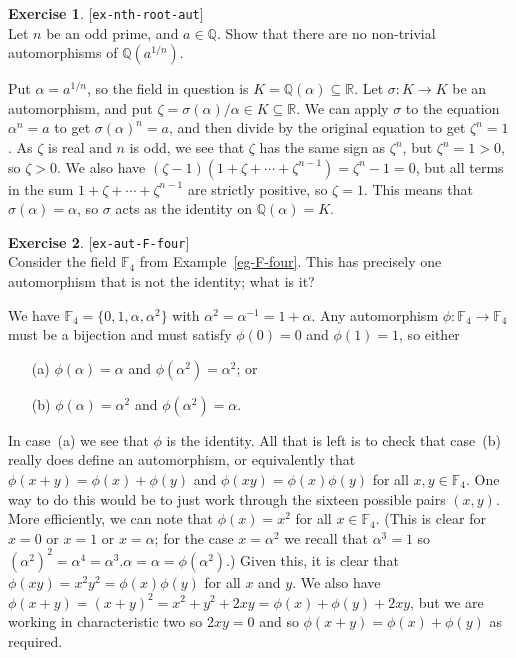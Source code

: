 \documentclass{amsart}
\newcommand{\Q}         {{\mathbb{Q}}}
\newcommand{\R}         {{\mathbb{R}}}
\newcommand{\F}         {{\mathbb{F}}}
\newcommand{\al}        {\alpha}
\newcommand{\zt}        {\zeta}
\newcommand{\sg}        {\sigma}
\newcommand{\sse}       {\subseteq}
\renewcommand{\:}{\colon}
\newcommand{\lastexlabel}{}
\newcommand{\exlabel}[1]{
 \global\def\lastexlabel{#1}\label{#1}[\texttt{#1}]\ \\
}
\newcommand{\exlabel}[1]{
 \global\def\lastexlabel{#1}\label{#1}
}
\newenvironment{solution}{\SolutionInline}{\endSolutionInline}
\theoremstyle{definition}
\newtheorem{exercise}{Exercise}[section]
\renewenvironment{solution}{\SolutionAtEnd}{\endSolutionAtEnd}
\begin{document}
\begin{exercise}\exlabel{ex-nth-root-aut}
 Let $n$ be an odd prime, and $a\in\Q$.  Show that there are no
 non-trivial automorphisms of $\Q(a^{1/n})$.
\end{exercise}
\begin{solution}
 Put $\al=a^{1/n}$, so the field in question is $K=\Q(\al)\sse\R$.
 Let $\sg\:K\to K$ be an automorphism, and put
 $\zt=\sg(\al)/\al\in K\sse\R$.  We can apply $\sg$ to the equation
 $\al^n=a$ to get $\sg(\al)^n=a$, and then divide by the original
 equation to get $\zt^n=1$.  As $\zt$ is real and $n$ is odd, we see
 that $\zt$ has the same sign as $\zt^n$, but $\zt^n=1>0$, so
 $\zt>0$.  We also have $(\zt-1)(1+\zt+\dotsb+\zt^{n-1})=\zt^n-1=0$,
 but all terms in the sum $1+\zt+\dotsb+\zt^{n-1}$ are strictly
 positive, so $\zt=1$.  This means that $\sg(\al)=\al$, so $\sg$ acts
 as the identity on $\Q(\al)=K$.
\end{solution}
\begin{exercise}\exlabel{ex-aut-F-four}
 Consider the field $\F_4$ from Example~\ref{eg-F-four}.  This has
 precisely one automorphism that is not the identity; what is it?
\end{exercise}
\begin{solution}
 We have $\F_4=\{0,1,\al,\al^2\}$ with $\al^2=\al^{-1}=1+\al$.  Any
 automorphism $\phi\:\F_4\to\F_4$ must be a bijection and must satisfy
 $\phi(0)=0$ and $\phi(1)=1$, so either 
 \begin{itemize}
  \item[(a)] $\phi(\al)=\al$ and $\phi(\al^2)=\al^2$; or
  \item[(b)] $\phi(\al)=\al^2$ and $\phi(\al^2)=\al$.
 \end{itemize}
 In case~(a) we see that $\phi$ is the identity.  All that is left
 is to check that case~(b) really does define an automorphism, or
 equivalently that $\phi(x+y)=\phi(x)+\phi(y)$ and
 $\phi(xy)=\phi(x)\phi(y)$ for all $x,y\in\F_4$.  One way to do this
 would be to just work through the sixteen possible pairs $(x,y)$.
 More efficiently, we can note that $\phi(x)=x^2$ for all $x\in\F_4$.
 (This is clear for $x=0$ or $x=1$ or $x=\al$; for the case $x=\al^2$
 we recall that $\al^3=1$ so
 $(\al^2)^2=\al^4=\al^3.\al=\al=\phi(\al^2)$.)  Given this, it is
 clear that $\phi(xy)=x^2y^2=\phi(x)\phi(y)$ for all $x$ and $y$.  We
 also have $\phi(x+y)=(x+y)^2=x^2+y^2+2xy=\phi(x)+\phi(y)+2xy$, but we
 are working in characteristic two so $2xy=0$ and so
 $\phi(x+y)=\phi(x)+\phi(y)$ as required.
\end{solution}
\end{document}
